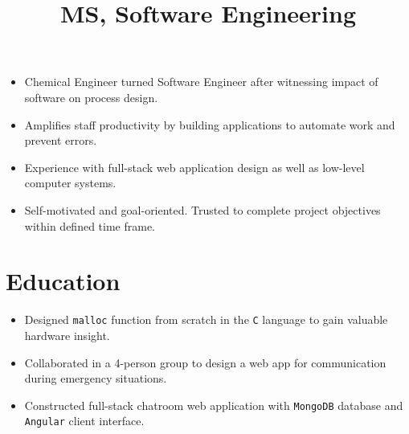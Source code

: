 \documentclass[12pt]{res} %
\begin{document}
    \begin{resume}

        \begin{itemize}
            \setlength{\itemindent}{-0.25in}

            \section{Summary}
            \itemsep0em 
            \item Chemical Engineer turned Software Engineer after witnessing impact of software on process design.
            \item Amplifies staff productivity by building applications to automate work and prevent errors.
            \item Experience with full-stack web application design as well as low-level computer systems. 
            \item Self-motivated and goal-oriented. Trusted to complete project objectives within defined time frame.									
        \end{itemize}
        \vspace{-12pt}

        \section{Education}
            
            \title{\bfseries MS, Software Engineering}
            \begin{position}
                \vspace{-14pt}
                \begin{itemize}
                \setlength{\itemindent}{-0.50in}
                \itemsep0em
                \item Designed \texttt{malloc} function from scratch in the \texttt{C} language to gain valuable hardware insight. 
                \item Collaborated in a 4-person group to design a web app for communication during emergency situations.
                \item Constructed full-stack chatroom web application with \texttt{MongoDB} database and \texttt{Angular} client interface.
                \end{itemize}
            \end{position}
            \vspace{-10pt}


\end{resume}
\end{document}
